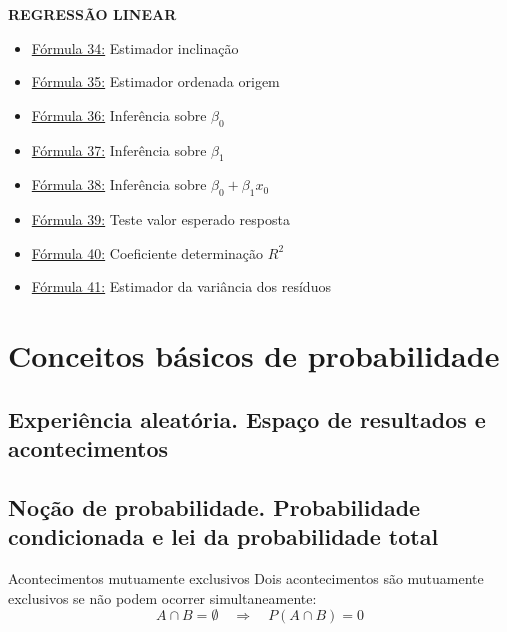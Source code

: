 \documentclass[a4paper,12pt]{article}
\begin{document}
\begin{multicols}{2}
\textbf{\color{sectioncolor}REGRESSÃO LINEAR}
\begin{itemize}[leftmargin=*]
    \item \hyperref[formula34]{\color{formulalink}Fórmula 34:} Estimador inclinação
    \item \hyperref[formula35]{\color{formulalink}Fórmula 35:} Estimador ordenada origem
    \item \hyperref[formula36]{\color{formulalink}Fórmula 36:} Inferência sobre $\beta_0$
    \item \hyperref[formula37]{\color{formulalink}Fórmula 37:} Inferência sobre $\beta_1$
    \item \hyperref[formula38]{\color{formulalink}Fórmula 38:} Inferência sobre $\beta_0 + \beta_1 x_0$
    \item \hyperref[formula39]{\color{formulalink}Fórmula 39:} Teste valor esperado resposta
    \item \hyperref[formula40]{\color{formulalink}Fórmula 40:} Coeficiente determinação $R^2$
    \item \hyperref[formula41]{\color{formulalink}Fórmula 41:} Estimador da variância dos resíduos
\end{itemize}
\end{multicols}

\newpage

\section{\color{sectioncolor}Conceitos básicos de probabilidade}
\subsection{Experiência aleatória. Espaço de resultados e acontecimentos}

\subsection{Noção de probabilidade. Probabilidade condicionada e lei da probabilidade total}

\begin{formulabox}{Acontecimentos mutuamente exclusivos}
Dois acontecimentos são mutuamente exclusivos se não podem ocorrer simultaneamente:
\begin{equation}\label{formula1}\tag{Fórmula 1}
A \cap B = \emptyset \quad \Rightarrow \quad P(A \cap B) = 0
\end{equation}
\end{formulabox}
\end{document}
